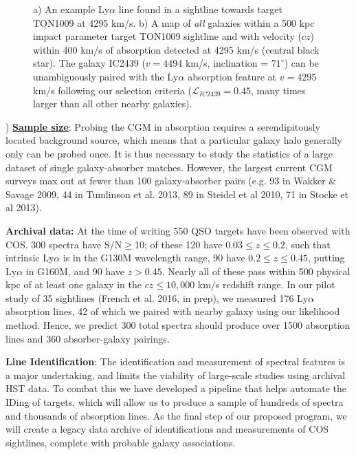 \documentclass[12pt]{article}
\begin{document}
\begin{figure}[t!]
\begin{subfigure}[t]{0.5\textwidth}
        \caption{}
    \end{subfigure}
  \caption{\small{a) An example Ly$\alpha$ line found in a sightline towards target TON1009 at 4295 km/s. b) A map of \textit{all} galaxies within a 500 kpc impact parameter target TON1009 sightline and with velocity ($cz$) within 400 km/s of absorption detected at 4295 km/s (central black star). The galaxy IC2439 ($v=4494$ km/s, inclination = $71^{\circ}$) can be unambiguously paired with the Ly$\alpha$ absorption feature at $v=4295$ km/s following our selection criteria ($\mathcal{L}_{IC2439} = 0.45$, many times larger than all other nearby galaxies).}}
  \vspace{-10pt}
\end{figure}



) \textbf{\underline{Sample size}}: Probing the CGM in absorption requires a serendipitously located background source, which means that a particular galaxy halo generally only can be probed once. It is thus necessary to study the statistics of a large dataset of single galaxy-absorber matches. However, the largest current CGM surveys max out at fewer than 100 galaxy-absorber pairs (e.g. 93 in Wakker $\&$ Savage 2009, 44 in Tumlinson et al. 2013, 89 in Steidel et al 2010, 71 in Stocke et al 2013).

\textbf{Archival data:} At the time of writing 550 QSO targets have been observed with COS. 300 spectra have S/N$\geq$10; of these 120 have $0.03\leq z \leq 0.2$, such that intrinsic Ly$\alpha$ is in the G130M wavelength range, 90 have $0.2\leq z \leq 0.45$, putting Ly$\alpha$ in G160M, and 90 have $z > 0.45$. Nearly all of these pass within 500 physical kpc of at least one galaxy in the $cz \leq 10,000$ km/s redshift range. In our pilot study of 35 sightlines (French et al. 2016, in prep), we measured 176 Ly$\alpha$ absorption lines, 42 of which we paired with nearby galaxy using our likelihood method. Hence, we predict 300 total spectra should produce over 1500 absorption lines and 360 absorber-galaxy pairings.

\textbf{Line Identification}: The identification and measurement of spectral features is a major undertaking, and limits the viability of large-scale studies using archival HST data. To combat this we have developed a pipeline that helps automate the IDing of targets, which will allow us to produce a sample of hundreds of spectra and thousands of absorption lines. As the final step of our proposed program, we will create a legacy data archive of identifications and measurements of COS sightlines, complete with probable galaxy associations.\\
\end{document}
